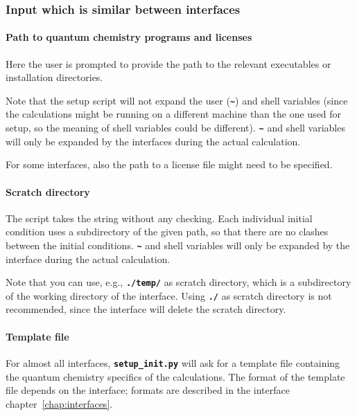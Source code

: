 \documentclass[a4paper,10pt,DIV=15,openany]{scrbook}
\newcommand{\ttt}[1]{\textbf{\texttt{#1}}}
\begin{document}
\subsubsection{Input which is similar between interfaces}\label{sec:setup_init.py:several}

\paragraph{Path to quantum chemistry programs and licenses}

Here the user is prompted to provide the path to the relevant executables or installation directories. 

Note that the setup script will not expand the user (\ttt{\textasciitilde}) and shell variables (since the calculations might be running on a different machine than the one used for setup, so the meaning of shell variables could be different). \ttt{\textasciitilde} and shell variables will only be expanded by the interfaces during the actual calculation.

For some interfaces, also the path to a license file might need to be specified.

\paragraph{Scratch directory}

The script takes the string without any checking. Each individual initial condition uses a subdirectory of the given path, so that there are no clashes between the initial conditions. \ttt{\textasciitilde} and shell variables will only be expanded by the interface during the actual calculation.

Note that you can use, e.g., \ttt{./temp/} as scratch directory, which is a subdirectory of the working directory of the interface. Using \ttt{./} as scratch directory is not recommended, since the interface will delete the scratch directory.

\paragraph{Template file}

For almost all interfaces, \ttt{setup\_init.py} will ask for a template file containing the quantum chemistry specifics of the calculations. The format of the template file depends on the interface; formats are described in the interface chapter~\ref{chap:interfaces}.
\end{document}
